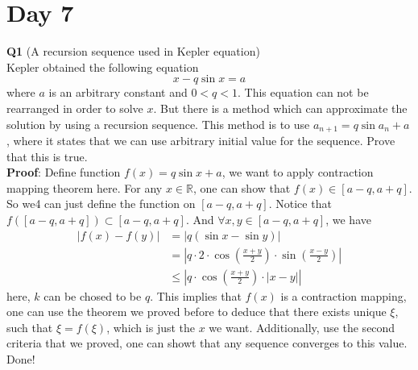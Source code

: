 \documentclass{article}
\newcommand{\tb}[1]{\textbf{#1}}
\begin{document}
\section{Day 7}
\tb{Q1} (A recursion sequence used in Kepler equation)\\
Kepler obtained the following equation
$$
x - q \sin x = a
$$
where $a$ is an arbitrary constant and $0< q <1$. This equation can not be rearranged in order to solve 
$x$. But there is a method which can approximate the solution by using a recursion sequence. This method 
is to use $a_{n+1} = q \sin a_n +a$, where it states that we can use arbitrary initial value for the sequence.
Prove that this is true. \\
\tb{Proof}: Define function $f(x)= q \sin x + a$, we want to apply contraction mapping theorem here. For any $x\in \mathbb{R}$, 
one can show that $f(x) \in [a-q,a+q]$. So we4 can just define the function on $[a-q, a+q]$. Notice that $f([a-q,a+q]) \subset [a-q,a+q]$.
And $\forall x, y \in [a-q,a+q]$, we have 
\begin{align*}
|f(x)-f(y)| &= |q(\sin x -\sin y)|\\
            &= \left|q \cdot 2 \cdot \cos \left( \frac{x+y}{2}\right) \cdot \sin \left(\frac{x-y}{2}\right)\right|\\
            &\leq \left|q \cdot \cos \left( \frac{x+y}{2}\right) \cdot |x-y|\right|
\end{align*}
here, $k$ can be chosed to be $q$. This implies that $f(x)$ is a contraction mapping, one can use the theorem we proved before to deduce that 
there exists unique $\xi$, such that $\xi = f(\xi)$, which is just the $x$ we want. Additionally, use the second criteria that we proved, one can 
showt that any sequence converges to this value. Done!\\
\\
\\
\\
\\
\end{document}
